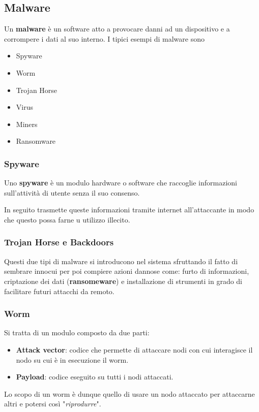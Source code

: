 \subsection{Malware}
Un \textbf{malware} è un software atto a provocare danni ad un dispositivo e a corrompere i dati al suo interno. I
tipici esempi di malware sono
\begin{itemize}
	\item Spyware
	\item Worm
	\item Trojan Horse
	\item Virus
	\item Miners
	\item Ransomware
\end{itemize}

\subsubsection{Spyware}
Uno \textbf{spyware} è un modulo hardware o software che raccoglie informazioni sull'attività di utente senza il suo
consenso.

In seguito trasmette queste informazioni tramite internet all'attaccante in modo che questo possa farne u utilizzo
illecito.

\subsubsection{Trojan Horse e Backdoors}
Questi due tipi di malware si introducono nel sistema sfruttando il fatto di sembrare innocui per poi compiere azioni
dannose come: furto di informazioni, criptazione dei dati (\textbf{ransomeware}) e installazione di strumenti in grado
di facilitare futuri attacchi da remoto.

\subsubsection{Worm}
Si tratta di un modulo composto da due parti:
\begin{itemize}
	\item \textbf{Attack vector}: codice che permette di attaccare nodi con cui interagisce il nodo su cui è in
	      esecuzione il worm.
	\item \textbf{Payload}: codice eseguito su tutti i nodi attaccati.
\end{itemize}
Lo scopo di un worm è dunque quello di usare un nodo attaccato per attaccarne altri e potersi così "\emph{riprodurre}".

